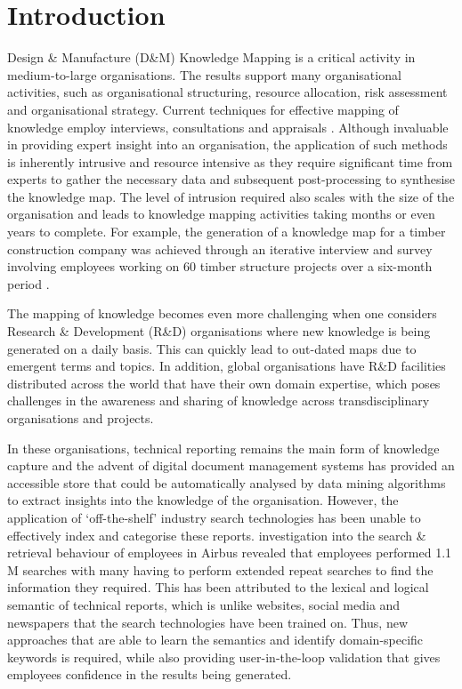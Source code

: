 \documentclass[a4paper, 11pt]{article}
\begin{document}


\section{Introduction}

Design \& Manufacture (D\&M) Knowledge Mapping is a critical activity in medium-to-large organisations.
The results support many organisational activities, such as organisational structuring, resource allocation, risk assessment and organisational strategy.
Current techniques for effective mapping of knowledge employ interviews, consultations and appraisals \parencite{jafari2009}.
Although invaluable in providing expert insight into an organisation, the application of such methods is inherently intrusive and resource intensive as they require significant time from experts to gather the necessary data and subsequent post-processing to synthesise the knowledge map.
The level of intrusion required also scales with the size of the organisation and leads to knowledge mapping activities taking months or even years to complete.
For example, the generation of a knowledge map for a timber construction company was achieved through an iterative interview and survey involving employees working on 60 timber structure projects over a six-month period \parencite{bjornfot2007}.

The mapping of knowledge becomes even more challenging when one considers Research \& Development (R\&D) organisations where new knowledge is being generated on a daily basis.
This can quickly lead to out-dated maps due to emergent terms and topics.
In addition, global organisations have R\&D facilities distributed across the world that have their own domain expertise, which poses challenges in the awareness and sharing of knowledge across transdisciplinary organisations and projects.

In these organisations, technical reporting remains the main form of knowledge capture and the advent of digital document management systems has provided an accessible store that could be automatically analysed by data mining algorithms to extract insights into the knowledge of the organisation.
However, the application of ‘off-the-shelf’ industry search technologies has been unable to effectively index and categorise these reports.
\textcite{jones2015} investigation into the search \& retrieval behaviour of employees in Airbus revealed that employees performed 1.1 M searches with many having to perform extended repeat searches to find the information they required.
This has been attributed to the lexical and logical semantic of technical reports, which is unlike websites, social media and newspapers that the search technologies have been trained on.
Thus, new approaches that are able to learn the semantics and identify domain-specific keywords is required, while also providing user-in-the-loop validation that gives employees confidence in the results being generated.
\end{document}
